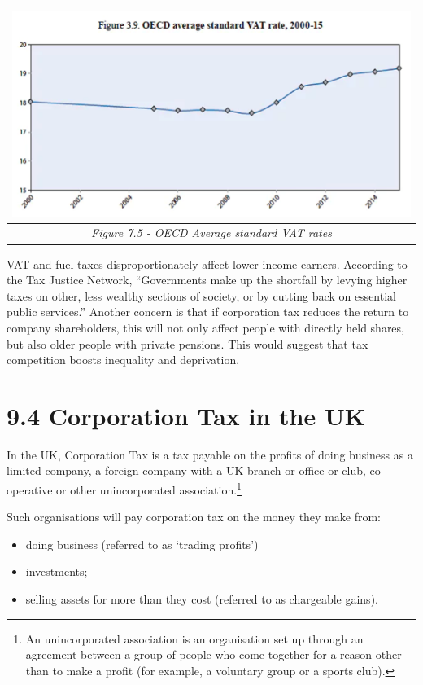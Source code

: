 \documentclass[]{tufte-handout}
\providecommand{\tightlist}{%
  \setlength{\itemsep}{0pt}\setlength{\parskip}{0pt}}
\begin{document}
\begin{longtable}[]{@{}c@{}}
\toprule
\includegraphics{ChapterPictures/7-5-OECDVATRates.png}\tabularnewline
\midrule
\endhead
\emph{Figure 7.5 - OECD Average standard VAT rates}\tabularnewline
\bottomrule
\end{longtable}

VAT and fuel taxes disproportionately affect lower income earners.
According to the Tax Justice Network, ``Governments make up the
shortfall by levying higher taxes on other, less wealthy sections of
society, or by cutting back on essential public services.'' Another
concern is that if corporation tax reduces the return to company
shareholders, this will not only affect people with directly held
shares, but also older people with private pensions. This would suggest
that tax competition boosts inequality and deprivation.

\hypertarget{corporation-tax-in-the-uk}{%
\section{9.4 Corporation Tax in the
UK}\label{corporation-tax-in-the-uk}}

In the UK, Corporation Tax is a tax payable on the profits of doing
business as a limited company, a foreign company with a UK branch or
office or club, co-operative or other unincorporated
association.\footnote{An unincorporated association is an organisation
  set up through an agreement between a group of people who come
  together for a reason other than to make a profit (for example, a
  voluntary group or a sports club).}

Such organisations will pay corporation tax on the money they make from:

\begin{itemize}
\tightlist
\item
  doing business (referred to as `trading profits')
\item
  investments;
\item
  selling assets for more than they cost (referred to as chargeable
  gains).
\end{itemize}
\end{document}
